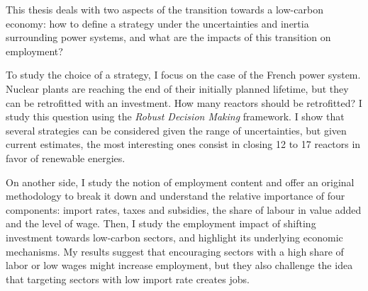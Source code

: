 
This thesis deals with two aspects of the transition towards a low-carbon economy: how to define a strategy under the uncertainties and inertia surrounding power systems, and what are the impacts of this transition on employment?

To study the choice of a strategy, I focus on the case of the French power system. Nuclear plants are reaching the end of their initially planned lifetime, but they can be retrofitted with an investment. How many reactors should be retrofitted? I study this question using the \textit{Robust Decision Making} framework. I show that several strategies can be considered given the range of uncertainties, but given current estimates, the most interesting ones consist in closing 12 to 17 reactors in favor of renewable energies.

On another side, I study the notion of employment content and offer an original methodology to break it down and understand the relative importance of four components: import rates, taxes and subsidies, the share of labour in value added and the level of wage.
Then, I study the employment impact of shifting investment towards low-carbon sectors, and highlight its underlying economic mechanisms.
My results suggest that encouraging sectors with a high share of labor or low wages might increase employment, but they also challenge the idea that targeting sectors with low import rate creates jobs.